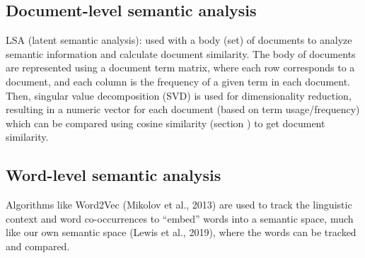 \subsection{Document-level semantic analysis}

LSA (latent semantic analysis): used with a body (set) of documents to analyze semantic information and calculate document similarity. The body of documents are represented using a document term matrix, where each row corresponds to a document, and each column is the frequency of a given term in each document. Then, singular value decomposition (SVD) is used for dimensionality reduction, resulting in a numeric vector for each document (based on term usage/frequency) which can be compared using cosine similarity (section ) to get document similarity.

\subsection{Word-level semantic analysis}

Algorithms like Word2Vec (Mikolov et al., 2013) are used to track the linguistic context and word co-occurrences to ``embed'' words into a semantic space, much like our own semantic space (Lewis et al., 2019), where the words can be tracked and compared. 

